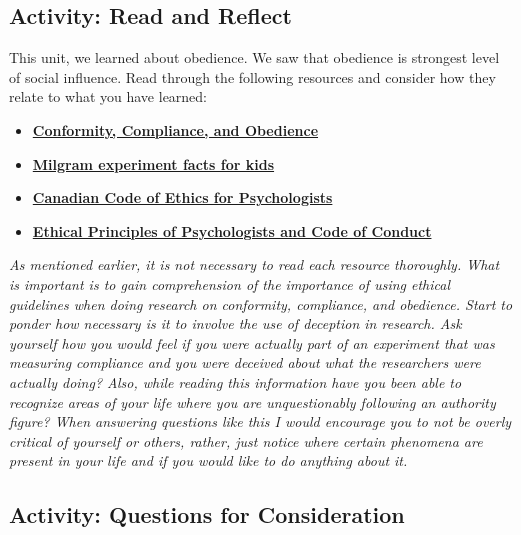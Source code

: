 \documentclass[
]{book}
\providecommand{\tightlist}{%
  \setlength{\itemsep}{0pt}\setlength{\parskip}{0pt}}
\begin{document}
\hypertarget{activity-read-and-reflect-8}{%
\subsection*{Activity: Read and Reflect}\label{activity-read-and-reflect-8}}

\begin{reflect}
This unit, we learned about obedience. We saw that obedience is strongest level of social influence. Read through the following resources and consider how they relate to what you have learned:

\begin{itemize}
\tightlist
\item
  \href{https://www.units.miamioh.edu/psybersite/cults/cco.shtml}{\textbf{Conformity, Compliance, and Obedience}}\\
\item
  \href{https://kids.kiddle.co/Milgram_experiment}{\textbf{Milgram experiment facts for kids}}
\item
  \href{https://cpa.ca/docs/File/Ethics/CPA_Code_2017_4thEd.pdf}{\textbf{Canadian Code of Ethics for Psychologists}}\\
\item
  \href{https://www.apa.org/ethics/code/index}{\textbf{Ethical Principles of Psychologists and Code of Conduct}}
\end{itemize}

\emph{As mentioned earlier, it is not necessary to read each resource thoroughly. What is important is to gain comprehension of the importance of using ethical guidelines when doing research on conformity, compliance, and obedience. Start to ponder how necessary is it to involve the use of deception in research. Ask yourself how you would feel if you were actually part of an experiment that was measuring compliance and you were deceived about what the researchers were actually doing? Also, while reading this information have you been able to recognize areas of your life where you are unquestionably following an authority figure? When answering questions like this I would encourage you to not be overly critical of yourself or others, rather, just notice where certain phenomena are present in your life and if you would like to do anything about it.}
\end{reflect}

\hypertarget{activity-questions-for-consideration-10}{%
\subsection*{Activity: Questions for Consideration}\label{activity-questions-for-consideration-10}}
\end{document}
